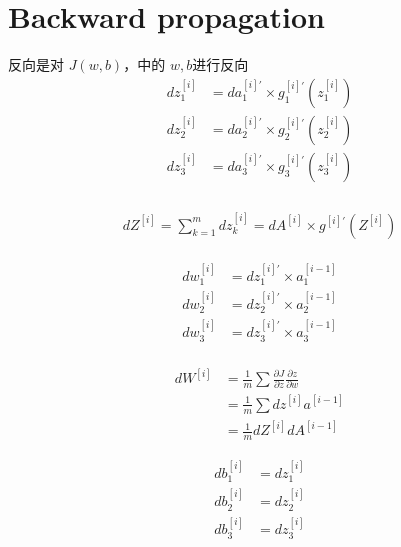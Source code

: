 \documentclass{article}
\begin{document}
\section{Backward propagation} %
\label{sec:backward_propagation}
	反向是对 $J(w,b)$，中的 $w , b$进行反向
	\begin{equation}
	\begin{split}
	dz_{1}^{[i]} &= da_{1}^{[i]'}\times g_{1}^{[i]'}(z_{1}^{[i]}) \\
	dz_{2}^{[i]} &= da_{2}^{[i]'}\times g_{2}^{[i]'}(z_{2}^{[i]}) \\
	dz_{3}^{[i]} &= da_{3}^{[i]'}\times g_{3}^{[i]'}(z_{3}^{[i]}) \\
	\end{split}
	\end{equation}

	\begin{gather}
	\begin{split}
	dZ^{[i]} = \sum_{k=1}^m dz_{k}^{[i]} = 
 	dA^{[i]} \times g^{[i]'}(Z^{[i]})
	\end{split}
	\end{gather}

	\begin{equation}
	\begin{split}
	dw_{1}^{[i]} &= dz_{1}^{[i]'}\times a_{1}^{[i-1]} \\
	dw_{2}^{[i]} &= dz_{2}^{[i]'}\times a_{2}^{[i-1]} \\
	dw_{3}^{[i]} &= dz_{3}^{[i]'}\times a_{3}^{[i-1]} \\
	\end{split}
	\end{equation}

	\begin{equation}
	\begin{split}
	dW^{[i]} &= \frac{1}{m}\sum \frac{\partial{J}}{\partial z}\frac{\partial{z}}{\partial w}\\
		& = \frac{1}{m}\sum dz^{[i]}a^{[i-1]}\\
		& = \frac{1}{m}dZ^{[i]}dA^{[i-1]}
	\end{split}
	\end{equation}

	\begin{equation}
	\begin{split}
	db_{1}^{[i]} &= dz_{1}^{[i]} \\
	db_{2}^{[i]} &= dz_{2}^{[i]}  \\
	db_{3}^{[i]} &= dz_{3}^{[i]} \\
	\end{split}
	\end{equation}
\end{document}
